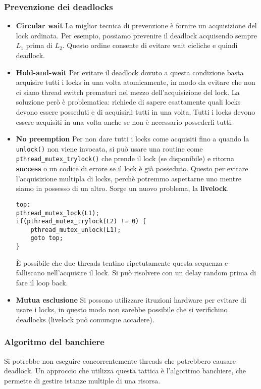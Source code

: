 \documentclass[12pt, twoside, letterpaper]{article}
\begin{document}
			\subsubsection{Prevenzione dei deadlocks}
				\begin{itemize}
					\item \textbf{Circular wait} La miglior tecnica di prevenzione è fornire un acquisizione del lock ordinata. Per esempio, possiamo prevenire il deadlock acquisendo sempre $L_1$ prima di $L_2$. Questo ordine consente di evitare wait cicliche e quindi deadlock.
					\item \textbf{Hold-and-wait} Per evitare il deadlock dovuto a questa condizione basta acquisire tutti i locks in una volta atomicamente, in modo da evitare che non ci siano thread switch prematuri nel mezzo dell'acquisizione del lock. La soluzione però è problematica: richiede di sapere esattamente quali locks devono essere posseduti e di acquisirli tutti in una volta. Tutti i locks devono essere acquisiti in una volta anche se non è necessario possederli tutti.
					\item \textbf{No preemption} Per non dare tutti i locks come acquisiti fino a quando la \texttt{unlock()} non viene invocata, si può usare una routine come \texttt{pthread\_mutex\_trylock()} che prende il lock (se disponibile) e ritorna \textbf{success} o un codice di errore se il lock è già posseduto. Questo per evitare l'acquisizione multipla di locks, perchè potremmo aspettarne uno mentre siamo in possesso di un altro. Sorge un nuovo problema, la \textbf{livelock}. 
					\begin{lstlisting}[style=CStyle]
top:
pthread_mutex_lock(L1);
if(pthread_mutex_trylock(L2) != 0) {
	pthread_mutex_unlock(L1);
	goto top;
}					\end{lstlisting}					
					È possibile che due threads tentino ripetutamente questa sequenza e falliscano nell'acquisire il lock. Si può risolvere con un delay random prima di fare il loop back.
					\item \textbf{Mutua esclusione} Si possono utilizzare itruzioni hardware per evitare di usare i locks, in questo modo non sarebbe possibile che si verifichino deadlocks (livelock può comunque accadere).
				\end{itemize}
				
			\subsubsection{Algoritmo del banchiere}
				Si potrebbe non eseguire concorrentemente threads che potrebbero causare deadlock. Un approccio che utilizza questa tattica è l'algoritmo banchiere, che permette di gestire istanze multiple di una risorsa. 
				
\end{document}
